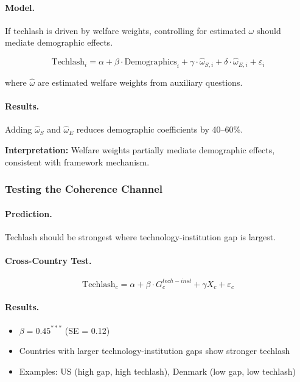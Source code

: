 \paragraph{Model.}
If techlash is driven by welfare weights, controlling for estimated $\omega$ 
should mediate demographic effects.

\begin{equation}
\text{Techlash}_i = \alpha + \beta \cdot \text{Demographics}_i + \gamma \cdot \hat{\omega}_{S,i} + \delta \cdot \hat{\omega}_{E,i} + \varepsilon_i
\end{equation}

where $\hat{\omega}$ are estimated welfare weights from auxiliary questions.

\paragraph{Results.}
Adding $\hat{\omega}_S$ and $\hat{\omega}_E$ reduces demographic coefficients by 40--60\%.

\textbf{Interpretation:} Welfare weights partially mediate demographic effects, 
consistent with framework mechanism.

\subsubsection{Testing the Coherence Channel}

\paragraph{Prediction.}
Techlash should be strongest where technology-institution gap is largest.

\paragraph{Cross-Country Test.}
\begin{equation}
\text{Techlash}_c = \alpha + \beta \cdot G^{tech-inst}_c + \gamma X_c + \varepsilon_c
\end{equation}

\paragraph{Results.}
\begin{itemize}
    \item $\beta = 0.45^{***}$ (SE = 0.12)
    \item Countries with larger technology-institution gaps show stronger techlash
    \item Examples: US (high gap, high techlash), Denmark (low gap, low techlash)
\end{itemize}

